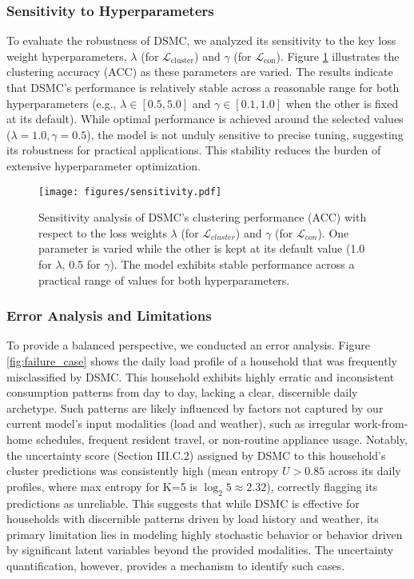 \documentclass[journal]{IEEEtran}
\begin{document}
\subsubsection{Sensitivity to Hyperparameters}
To evaluate the robustness of DSMC, we analyzed its sensitivity to the key loss weight hyperparameters, $\lambda$ (for $\mathcal{L}_{\text{cluster}}$) and $\gamma$ (for $\mathcal{L}_{\text{con}}$). Figure \ref{fig:sensitivity} illustrates the clustering accuracy (ACC) as these parameters are varied. The results indicate that DSMC's performance is relatively stable across a reasonable range for both hyperparameters (e.g., $\lambda \in [0.5, 5.0]$ and $\gamma \in [0.1, 1.0]$ when the other is fixed at its default). While optimal performance is achieved around the selected values ($\lambda=1.0, \gamma=0.5$), the model is not unduly sensitive to precise tuning, suggesting its robustness for practical applications. This stability reduces the burden of extensive hyperparameter optimization.

\begin{figure}[h!]
\centering
\texttt{[image: figures/sensitivity.pdf]} %
\caption{Sensitivity analysis of DSMC's clustering performance (ACC) with respect to the loss weights $\lambda$ (for $\mathcal{L}_{cluster}$) and $\gamma$ (for $\mathcal{L}_{con}$). One parameter is varied while the other is kept at its default value (1.0 for $\lambda$, 0.5 for $\gamma$). The model exhibits stable performance across a practical range of values for both hyperparameters.}
\label{fig:sensitivity}
\end{figure}

\subsubsection{Error Analysis and Limitations}
To provide a balanced perspective, we conducted an error analysis. Figure \ref{fig:failure_case} shows the daily load profile of a household that was frequently misclassified by DSMC. This household exhibits highly erratic and inconsistent consumption patterns from day to day, lacking a clear, discernible daily archetype. Such patterns are likely influenced by factors not captured by our current model's input modalities (load and weather), such as irregular work-from-home schedules, frequent resident travel, or non-routine appliance usage. Notably, the uncertainty score (Section III.C.2) assigned by DSMC to this household's cluster predictions was consistently high (mean entropy $U > 0.85$ across its daily profiles, where max entropy for K=5 is $\log_2 5 \approx 2.32$), correctly flagging its predictions as unreliable. This suggests that while DSMC is effective for households with discernible patterns driven by load history and weather, its primary limitation lies in modeling highly stochastic behavior or behavior driven by significant latent variables beyond the provided modalities. The uncertainty quantification, however, provides a mechanism to identify such cases.
\end{document}

